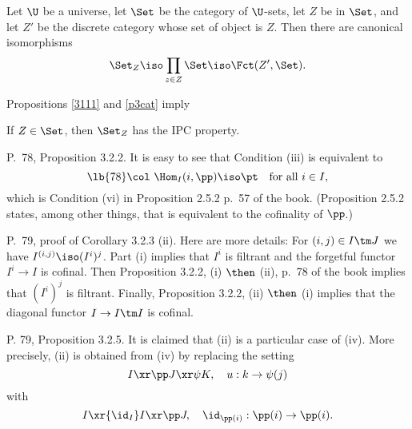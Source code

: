 \documentclass[12pt]{article}
\theoremstyle{remark}
\theoremstyle{definition}
\begin{document}
\begin{s}
\begin{prop}Let $\U$ be a universe, let $\Set$ be the category of $\U$-sets, let $Z$ be in $\Set$, and let $Z'$ be the discrete category whose set of object is $Z$. Then there are canonical isomorphisms$$\Set_Z\iso\prod_{z\in Z}\Set\iso\Fct(Z',\Set).$$\end{prop}

Propositions \ref{3111} and \ref{p3cat} imply
\begin{prop}  
If $Z\in\Set$, then $\Set_Z$ has the IPC property.
\end{prop} 
\end{s} 

%

\begin{s} 
P.~78, Proposition 3.2.2. It is easy to see that Condition (iii) is equivalent to
\begin{equation}\lb{78} 
\col\ \Hom_I(i,\pp)\iso\pt\quad\text{for all }i\in I, 
\end{equation} 
which is Condition (vi) in Proposition 2.5.2 p.~57 of the book. (Proposition 2.5.2 states, among other things, that  is equivalent to the cofinality of $\pp$.)
\end{s}

%

\begin{s} 
P.~79, proof of Corollary 3.2.3 (ii). Here are more details: For $(i,j)\in I\tm J$ we have $I^{(i,j)}\iso(I^i)^j$. Part (i) implies that $I^i$ is filtrant and the forgetful functor $I^i\to I$ is cofinal. Then Proposition 3.2.2, (i) $\then$ (ii), p.~78 of the book implies that $(I^i)^j$ is filtrant. Finally, Proposition 3.2.2, (ii) $\then$ (i) implies that the diagonal functor $I\to I\tm I$ is cofinal.
\end{s}

%

\begin{s}
P. 79, Proposition 3.2.5. It is claimed that (ii) is a particular case of (iv). More precisely, (ii) is obtained from (iv) by replacing the setting 
$$
I\xr\pp J\xr\psi K,\quad u:k\to\psi(j)
$$ 
with 
$$
I\xr{\id_I}I\xr\pp J,\quad\id_{\pp(i)}:\pp(i)\to\pp(i).
$$ 
\end{s}

%
\end{document}
